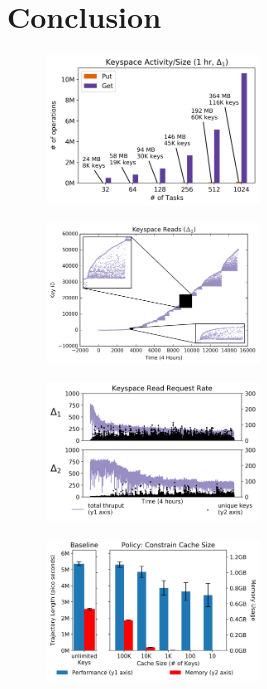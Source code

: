 \section{Conclusion}
\begin{figure}[tb]
  \noindent\includegraphics[width=0.5\textwidth]{figures/keyspace-analysis_size.png}\\
  \caption{\label{fig:keyspace-analysis_size}}
\end{figure}
\begin{figure}[tb]
  \noindent\includegraphics[width=0.5\textwidth]{figures/keyspace-analysis_locality.png}\\
  \caption{\label{fig:keyspace-analysis_locality}}
\end{figure}
\begin{figure}[tb]
  \noindent\includegraphics[width=0.5\textwidth]{figures/keyspace-analysis_throughput.png}\\
  \caption{\label{fig:keyspace-analysis_throughput}}
\end{figure}
\begin{figure}[tb]
  \noindent\includegraphics[width=0.5\textwidth]{figures/keyspace-analysis_cachesize.png}\\
  \caption{\label{fig:keyspace-analysis_cachesize}}
\end{figure}
